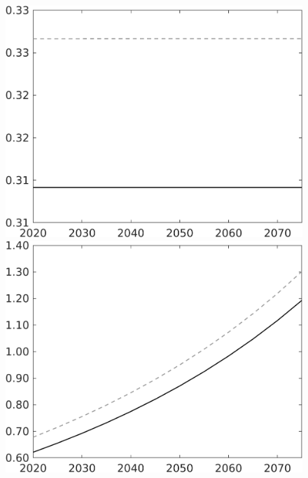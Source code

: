 \documentclass[12pt]{article}
\begin{document}
\begin{figure}[h!!]
\begin{minipage}[]{0.32\textwidth}
	\end{minipage}	
	\begin{minipage}[]{0.32\textwidth}
		\includegraphics[width=1\textwidth]{../../codding_model/own_basedOnFried/optimalPol_010922_revision/figures/all_13Sept22/CompTaul_LFBAU_Reg0_hl_spillover0_nsk0_xgr1_knspil0_sep1_countec0_GovRev0_etaa0.79_lgd0.png}
	\end{minipage}	
	\begin{minipage}[]{0.32\textwidth}
		\includegraphics[width=1\textwidth]{../../codding_model/own_basedOnFried/optimalPol_010922_revision/figures/all_13Sept22/CompTaul_LFBAU_Reg0_C_spillover0_nsk0_xgr1_knspil0_sep1_countec0_GovRev0_etaa0.79_lgd0.png}

\end{minipage}
\end{figure}
\end{document}
